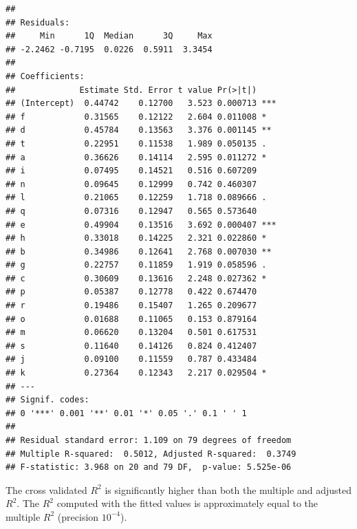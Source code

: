 \documentclass[11pt]{article}\usepackage[]{graphicx}\usepackage[]{color}
\makeatletter
\newenvironment{kframe}{%
 \def\at@end@of@kframe{}%
 \ifinner\ifhmode%
  \def\at@end@of@kframe{\end{minipage}}%
  \begin{minipage}{\columnwidth}%
 \fi\fi%
 \def\FrameCommand##1{\hskip\@totalleftmargin \hskip-\fboxsep
 \colorbox{shadecolor}{##1}\hskip-\fboxsep
     \hskip-\linewidth \hskip-\@totalleftmargin \hskip\columnwidth}%
 \MakeFramed {\advance\hsize-\width
   \@totalleftmargin\z@ \linewidth\hsize
   \@setminipage}}%
 {\par\unskip\endMakeFramed%
 \at@end@of@kframe}
\newenvironment{knitrout}{}{} %
\makeatother
\begin{document}
\begin{knitrout}
\begin{kframe}
\begin{lstlisting}[basicstyle=\ttfamily,breaklines=true]
## 
## Residuals:
##     Min      1Q  Median      3Q     Max 
## -2.2462 -0.7195  0.0226  0.5911  3.3454 
## 
## Coefficients:
##             Estimate Std. Error t value Pr(>|t|)    
## (Intercept)  0.44742    0.12700   3.523 0.000713 ***
## f            0.31565    0.12122   2.604 0.011008 *  
## d            0.45784    0.13563   3.376 0.001145 ** 
## t            0.22951    0.11538   1.989 0.050135 .  
## a            0.36626    0.14114   2.595 0.011272 *  
## i            0.07495    0.14521   0.516 0.607209    
## n            0.09645    0.12999   0.742 0.460307    
## l            0.21065    0.12259   1.718 0.089666 .  
## q            0.07316    0.12947   0.565 0.573640    
## e            0.49904    0.13516   3.692 0.000407 ***
## h            0.33018    0.14225   2.321 0.022860 *  
## b            0.34986    0.12641   2.768 0.007030 ** 
## g            0.22757    0.11859   1.919 0.058596 .  
## c            0.30609    0.13616   2.248 0.027362 *  
## p            0.05387    0.12778   0.422 0.674470    
## r            0.19486    0.15407   1.265 0.209677    
## o            0.01688    0.11065   0.153 0.879164    
## m            0.06620    0.13204   0.501 0.617531    
## s            0.11640    0.14126   0.824 0.412407    
## j            0.09100    0.11559   0.787 0.433484    
## k            0.27364    0.12343   2.217 0.029504 *  
## ---
## Signif. codes:  
## 0 '***' 0.001 '**' 0.01 '*' 0.05 '.' 0.1 ' ' 1
## 
## Residual standard error: 1.109 on 79 degrees of freedom
## Multiple R-squared:  0.5012,	Adjusted R-squared:  0.3749 
## F-statistic: 3.968 on 20 and 79 DF,  p-value: 5.525e-06
\end{lstlisting}
\end{kframe}
\end{knitrout}
The cross validated $R^2$ is significantly higher than both the multiple and adjusted $R^2$. The $R^2$ computed with the fitted values is approximately equal to the multiple $R^2$ (precision $10^{-4}$).

\section{}
\end{document}
